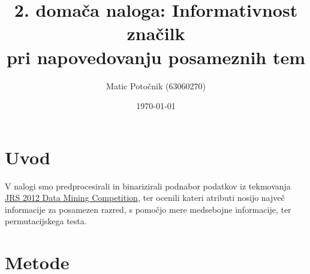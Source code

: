 \documentclass[a4paper,11pt]{article}
\title{2. domača naloga: Informativnost značilk\\pri napovedovanju posameznih tem}
\author{Matic Potočnik (63060270)}
\date{\today}
\begin{document}
\maketitle

\section{Uvod}

V nalogi smo predprocesirali in binarizirali podnabor podatkov iz tekmovanja \href{http://tunedit.org/challenge/JRS12Contest}{JRS 2012 Data Mining Competition}, ter ocenili kateri atributi nosijo največ informacije za posamezen razred, s pomočjo mere medsebojne informacije, ter permutacijskega testa.

\section{Metode}
\end{document}
